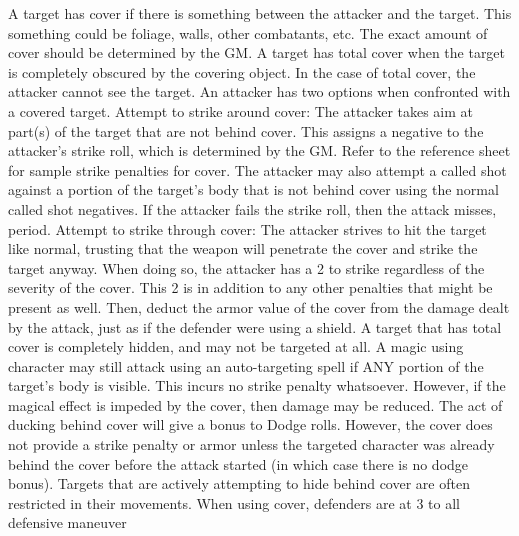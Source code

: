 \documentclass[twoside]{book}
\begin{document}
                
              A target has cover if there is something between
               the attacker and the target. This something could be
               foliage, walls, other combatants, etc. The exact amount of
               cover should be determined by the GM. A target has total
               cover when the target is completely obscured by the
               covering object. In the case of total cover, the attacker
               cannot see the target.   An attacker has two options when confronted with a
               covered target.   Attempt to strike around cover: The attacker takes
               aim at part(s) of the target that are not behind cover.
               This assigns a negative to the attacker's strike
               roll, which is determined by the GM. Refer to the
               reference sheet for sample strike penalties for cover. The
               attacker may also attempt a called shot against a portion
               of the target's body that is not behind cover using
               the normal called shot negatives. If the attacker fails
               the strike roll, then the attack misses, period.   Attempt to strike through cover: The attacker
               strives to hit the target like normal, trusting that the
               weapon will penetrate the cover and strike the target
               anyway. When doing so, the attacker has a 2 to
               strike regardless of the severity of the cover. This
               2 is in addition to any other penalties that might
               be present as well. Then, deduct the armor value of the
               cover from the damage dealt by the attack, just as if the
               defender were using a shield.   A target that has total cover is completely hidden,
               and may not be targeted at all.   A magic using character may still attack using an
               auto-targeting spell if ANY portion of the target's
               body is visible. This incurs no strike penalty whatsoever.
               However, if the magical effect is impeded by the cover,
               then damage may be reduced.   The act of ducking behind cover will give a bonus
               to Dodge rolls. However, the cover does not provide a
               strike penalty or armor unless the targeted character was
               already behind the cover before the attack started (in
               which case there is no dodge bonus).   Targets that are actively attempting to hide behind
               cover are often restricted in their movements. When using
               cover, defenders are at 3 to all defensive maneuver
\end{document}

